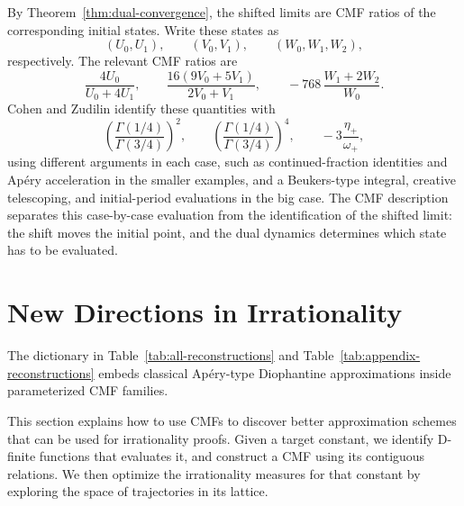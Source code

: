 \documentclass[oneside,english,11pt]{amsart}
\begin{document}
By Theorem~\ref{thm:dual-convergence}, the shifted limits are CMF ratios of the
corresponding initial states.  Write these states as
\[
    (U_0,U_1),\qquad
    (V_0,V_1),\qquad
    (W_0,W_1,W_2),
\]
respectively.  The relevant CMF ratios are
\[
    \frac{4U_0}{U_0+4U_1},\qquad
    \frac{16(9V_0+5V_1)}{2V_0+V_1},\qquad
    -768\,\frac{W_1+2W_2}{W_0}.
\]
Cohen and Zudilin identify these quantities with
\[
    \left(\frac{\Gamma(1/4)}{\Gamma(3/4)}\right)^2,\qquad
    \left(\frac{\Gamma(1/4)}{\Gamma(3/4)}\right)^4,\qquad
    -3\frac{\eta_+}{\omega_+},
\]
using different arguments in each case, such as continued-fraction identities
and Ap\'ery acceleration in the smaller examples, and a Beukers-type
integral, creative telescoping, and initial-period evaluations in the big
case.  The CMF description separates this case-by-case evaluation from the
identification of the shifted limit: the shift moves the initial point, and
the dual dynamics determines which state has to be evaluated.



\section{New Directions in Irrationality}
\label{sec:methodology}

The dictionary in Table~\ref{tab:all-reconstructions} and Table~\ref{tab:appendix-reconstructions} embeds classical Ap\'ery-type Diophantine approximations inside parameterized CMF families. 

This section explains how to use CMFs to discover better approximation schemes that can be used for irrationality proofs.
Given a target constant, we identify D-finite functions that evaluates it, and construct a CMF using its contiguous relations.
We then optimize the irrationality measures for that constant by exploring the space of trajectories in its lattice.
\end{document}
